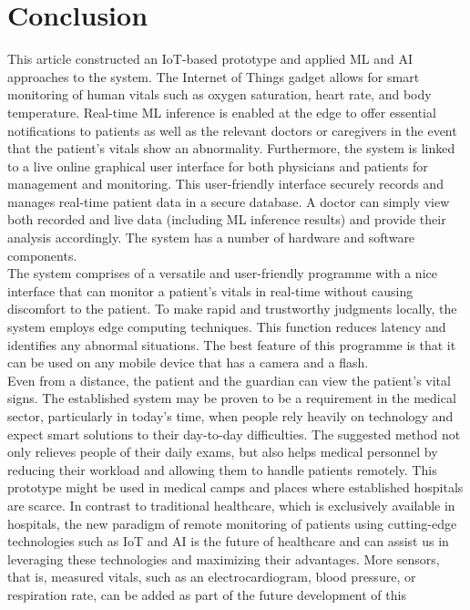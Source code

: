 \documentclass{bmcart}
\begin{document}
\section*{Conclusion}
This article constructed an IoT-based prototype and applied ML and AI approaches
to the system. The Internet of Things gadget allows for smart monitoring of
human vitals such as oxygen saturation, heart rate, and body temperature.
Real-time ML inference is enabled at the edge to offer essential notifications
to patients as well as the relevant doctors or caregivers in the event that the
patient's vitals show an abnormality. Furthermore, the system is linked to a
live online graphical user interface for both physicians and patients for
management and monitoring. This user-friendly interface securely records and
manages real-time patient data in a secure database. A doctor can simply view
both recorded and live data (including ML inference results) and provide their
analysis accordingly. The system has a number of hardware and software
components.\\
The system comprises of a versatile and user-friendly programme with a nice
interface that can monitor a patient's vitals in real-time without causing
discomfort to the patient. To make rapid and trustworthy judgments locally, the
system employs edge computing techniques. This function reduces latency and
identifies any abnormal situations. The best feature of this programme is that
it can be used on any mobile device that has a camera and a flash.\\
Even from a distance, the patient and the guardian can view the patient's vital
signs. The established system may be proven to be a requirement in the medical
sector, particularly in today's time, when people rely heavily on technology and
expect smart solutions to their day-to-day difficulties. The suggested method
not only relieves people of their daily exams, but also helps medical personnel
by reducing their workload and allowing them to handle patients remotely. This
prototype might be used in medical camps and places where established hospitals
are scarce. In contrast to traditional healthcare, which is exclusively
available in hospitals, the new paradigm of remote monitoring of patients using
cutting-edge technologies such as IoT and AI is the future of healthcare and can
assist us in leveraging these technologies and maximizing their advantages. More
sensors, that is, measured vitals, such as an electrocardiogram, blood pressure,
or respiration rate, can be added as part of the future development of this
\end{document}
